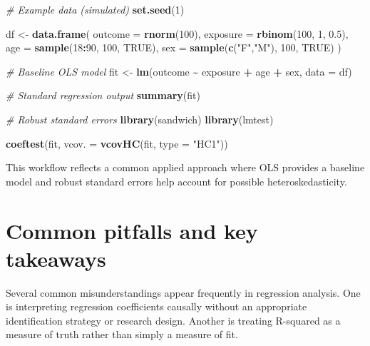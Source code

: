 \documentclass[
  11pt,
  oneside]{book}
\newenvironment{Shaded}{\begin{snugshade}}{\end{snugshade}}
\newcommand{\AttributeTok}[1]{\textcolor[rgb]{0.13,0.29,0.53}{#1}}
\newcommand{\CommentTok}[1]{\textcolor[rgb]{0.56,0.35,0.01}{\textit{#1}}}
\newcommand{\ConstantTok}[1]{\textcolor[rgb]{0.56,0.35,0.01}{#1}}
\newcommand{\DecValTok}[1]{\textcolor[rgb]{0.00,0.00,0.81}{#1}}
\newcommand{\FloatTok}[1]{\textcolor[rgb]{0.00,0.00,0.81}{#1}}
\newcommand{\FunctionTok}[1]{\textcolor[rgb]{0.13,0.29,0.53}{\textbf{#1}}}
\newcommand{\NormalTok}[1]{#1}
\newcommand{\OtherTok}[1]{\textcolor[rgb]{0.56,0.35,0.01}{#1}}
\newcommand{\SpecialCharTok}[1]{\textcolor[rgb]{0.81,0.36,0.00}{\textbf{#1}}}
\newcommand{\StringTok}[1]{\textcolor[rgb]{0.31,0.60,0.02}{#1}}
\begin{document}
\begin{Shaded}
\begin{Highlighting}[]
\CommentTok{\# Example data (simulated)}
\FunctionTok{set.seed}\NormalTok{(}\DecValTok{1}\NormalTok{)}

\NormalTok{df }\OtherTok{\textless{}{-}} \FunctionTok{data.frame}\NormalTok{(}
  \AttributeTok{outcome =} \FunctionTok{rnorm}\NormalTok{(}\DecValTok{100}\NormalTok{),}
  \AttributeTok{exposure =} \FunctionTok{rbinom}\NormalTok{(}\DecValTok{100}\NormalTok{, }\DecValTok{1}\NormalTok{, }\FloatTok{0.5}\NormalTok{),}
  \AttributeTok{age =} \FunctionTok{sample}\NormalTok{(}\DecValTok{18}\SpecialCharTok{:}\DecValTok{90}\NormalTok{, }\DecValTok{100}\NormalTok{, }\ConstantTok{TRUE}\NormalTok{),}
  \AttributeTok{sex =} \FunctionTok{sample}\NormalTok{(}\FunctionTok{c}\NormalTok{(}\StringTok{"F"}\NormalTok{,}\StringTok{"M"}\NormalTok{), }\DecValTok{100}\NormalTok{, }\ConstantTok{TRUE}\NormalTok{)}
\NormalTok{)}

\CommentTok{\# Baseline OLS model}
\NormalTok{fit }\OtherTok{\textless{}{-}} \FunctionTok{lm}\NormalTok{(outcome }\SpecialCharTok{\textasciitilde{}}\NormalTok{ exposure }\SpecialCharTok{+}\NormalTok{ age }\SpecialCharTok{+}\NormalTok{ sex, }\AttributeTok{data =}\NormalTok{ df)}

\CommentTok{\# Standard regression output}
\FunctionTok{summary}\NormalTok{(fit)}

\CommentTok{\# Robust standard errors}
\FunctionTok{library}\NormalTok{(sandwich)}
\FunctionTok{library}\NormalTok{(lmtest)}

\FunctionTok{coeftest}\NormalTok{(fit, }\AttributeTok{vcov. =} \FunctionTok{vcovHC}\NormalTok{(fit, }\AttributeTok{type =} \StringTok{"HC1"}\NormalTok{))}
\end{Highlighting}
\end{Shaded}

This workflow reflects a common applied approach where OLS provides a baseline model and robust standard errors help account for possible heteroskedasticity.

\section{Common pitfalls and key takeaways}\label{common-pitfalls-and-key-takeaways-3}

Several common misunderstandings appear frequently in regression analysis. One is interpreting regression coefficients causally without an appropriate identification strategy or research design. Another is treating R-squared as a measure of truth rather than simply a measure of fit.
\end{document}
